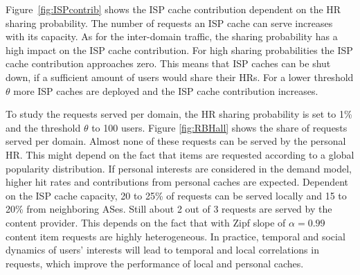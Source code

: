 Figure~\ref{fig:ISPcontrib} shows the ISP cache contribution dependent on the HR sharing probability. The number of requests an ISP cache can serve increases with its capacity. As for the inter-domain traffic, the sharing probability has a high impact on the ISP cache contribution. For high sharing probabilities the ISP cache contribution approaches zero. This means that ISP caches can be shut down, if a sufficient amount of users would share their HRs.
For a lower threshold $\theta$ more ISP caches are deployed and the ISP cache contribution increases.


To study the requests served per domain, the HR sharing probability is set to 1\% and the threshold $\theta$ to 100 users.
Figure \ref{fig:RBHall} shows the share of requests served per domain. Almost none of these requests can be served by the personal HR. This might depend on the fact that items are requested according to a global popularity distribution.
If personal interests are considered in the demand model, higher hit rates and contributions from personal caches are expected. Dependent on the ISP cache capacity, 20 to 25\% of requests can be served locally and 15 to 20\% from neighboring ASes. Still about 2 out of 3 requests are served by the content provider. This depends on the fact that with Zipf slope of $\alpha = 0.99$ content item requests are highly heterogeneous. In practice, temporal and social dynamics of users' interests will lead to temporal and local correlations in requests, which improve the performance of local and personal caches.
